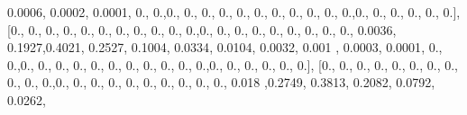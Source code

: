 \documentclass[
]{book}
\newenvironment{Shaded}{\begin{snugshade}}{\end{snugshade}}
\newcommand{\FloatTok}[1]{\textcolor[rgb]{0.00,0.00,0.81}{#1}}
\newcommand{\NormalTok}[1]{#1}
\begin{document}
\begin{Shaded}
\begin{Highlighting}[]
\FloatTok{0.0006}\NormalTok{, }\FloatTok{0.0002}\NormalTok{, }\FloatTok{0.0001}\NormalTok{, }\FloatTok{0.}\NormalTok{, }\FloatTok{0.}\NormalTok{,}\FloatTok{0.}\NormalTok{, }\FloatTok{0.}\NormalTok{, }\FloatTok{0.}\NormalTok{, }\FloatTok{0.}\NormalTok{, }\FloatTok{0.}\NormalTok{, }\FloatTok{0.}\NormalTok{, }\FloatTok{0.}\NormalTok{, }\FloatTok{0.}\NormalTok{, }\FloatTok{0.}\NormalTok{, }\FloatTok{0.}\NormalTok{, }\FloatTok{0.}\NormalTok{,}\FloatTok{0.}\NormalTok{,}
\FloatTok{0.}\NormalTok{, }\FloatTok{0.}\NormalTok{, }\FloatTok{0.}\NormalTok{, }\FloatTok{0.}\NormalTok{, }\FloatTok{0.}\NormalTok{], [}\FloatTok{0.}\NormalTok{, }\FloatTok{0.}\NormalTok{, }\FloatTok{0.}\NormalTok{, }\FloatTok{0.}\NormalTok{, }\FloatTok{0.}\NormalTok{, }\FloatTok{0.}\NormalTok{, }\FloatTok{0.}\NormalTok{, }\FloatTok{0.}\NormalTok{, }\FloatTok{0.}\NormalTok{, }\FloatTok{0.}\NormalTok{, }\FloatTok{0.}\NormalTok{,}\FloatTok{0.}\NormalTok{, }\FloatTok{0.}\NormalTok{, }\FloatTok{0.}\NormalTok{, }\FloatTok{0.}\NormalTok{,}
\FloatTok{0.}\NormalTok{, }\FloatTok{0.}\NormalTok{, }\FloatTok{0.}\NormalTok{, }\FloatTok{0.}\NormalTok{, }\FloatTok{0.}\NormalTok{, }\FloatTok{0.0036}\NormalTok{, }\FloatTok{0.1927}\NormalTok{,}\FloatTok{0.4021}\NormalTok{, }\FloatTok{0.2527}\NormalTok{, }\FloatTok{0.1004}\NormalTok{, }\FloatTok{0.0334}\NormalTok{, }\FloatTok{0.0104}\NormalTok{,}
\FloatTok{0.0032}\NormalTok{, }\FloatTok{0.001}\NormalTok{ , }\FloatTok{0.0003}\NormalTok{, }\FloatTok{0.0001}\NormalTok{, }\FloatTok{0.}\NormalTok{, }\FloatTok{0.}\NormalTok{,}\FloatTok{0.}\NormalTok{, }\FloatTok{0.}\NormalTok{, }\FloatTok{0.}\NormalTok{, }\FloatTok{0.}\NormalTok{, }\FloatTok{0.}\NormalTok{, }\FloatTok{0.}\NormalTok{, }\FloatTok{0.}\NormalTok{, }\FloatTok{0.}\NormalTok{, }\FloatTok{0.}\NormalTok{, }\FloatTok{0.}\NormalTok{,}
\FloatTok{0.}\NormalTok{,}\FloatTok{0.}\NormalTok{, }\FloatTok{0.}\NormalTok{, }\FloatTok{0.}\NormalTok{, }\FloatTok{0.}\NormalTok{, }\FloatTok{0.}\NormalTok{, }\FloatTok{0.}\NormalTok{], [}\FloatTok{0.}\NormalTok{, }\FloatTok{0.}\NormalTok{, }\FloatTok{0.}\NormalTok{, }\FloatTok{0.}\NormalTok{, }\FloatTok{0.}\NormalTok{, }\FloatTok{0.}\NormalTok{, }\FloatTok{0.}\NormalTok{, }\FloatTok{0.}\NormalTok{, }\FloatTok{0.}\NormalTok{, }\FloatTok{0.}\NormalTok{, }\FloatTok{0.}\NormalTok{,}\FloatTok{0.}\NormalTok{, }\FloatTok{0.}\NormalTok{,}
\FloatTok{0.}\NormalTok{, }\FloatTok{0.}\NormalTok{, }\FloatTok{0.}\NormalTok{, }\FloatTok{0.}\NormalTok{, }\FloatTok{0.}\NormalTok{, }\FloatTok{0.}\NormalTok{, }\FloatTok{0.}\NormalTok{, }\FloatTok{0.}\NormalTok{, }\FloatTok{0.018}\NormalTok{ ,}\FloatTok{0.2749}\NormalTok{, }\FloatTok{0.3813}\NormalTok{, }\FloatTok{0.2082}\NormalTok{, }\FloatTok{0.0792}\NormalTok{, }\FloatTok{0.0262}\NormalTok{,}

\end{Highlighting}
\end{Shaded}
\end{document}
